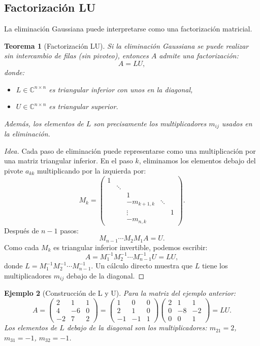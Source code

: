 \documentclass[a4paper,11pt]{report}
\newtheorem{theorem}{Teorema}[chapter]
\newtheorem{example}[theorem]{Ejemplo}
\begin{document}
\subsection{Factorización LU}

La eliminación Gaussiana puede interpretarse como una factorización matricial.

\begin{theorem}[Factorización LU]
Si la eliminación Gaussiana se puede realizar sin intercambio de filas (sin pivoteo), entonces $A$ admite una factorización:
\[
A = LU,
\]
donde:
\begin{itemize}
\item $L \in \mathbb{C}^{n \times n}$ es triangular inferior con unos en la diagonal,
\item $U \in \mathbb{C}^{n \times n}$ es triangular superior.
\end{itemize}
Además, los elementos de $L$ son precisamente los multiplicadores $m_{ij}$ usados en la eliminación.
\end{theorem}

\begin{proof}[Idea]
Cada paso de eliminación puede representarse como una multiplicación por una matriz triangular inferior. En el paso $k$, eliminamos los elementos debajo del pivote $a_{kk}$ multiplicando por la izquierda por:
\[
M_k = \begin{pmatrix}
1 & & & & \\
& \ddots & & & \\
& & 1 & & \\
& & -m_{k+1,k} & \ddots & \\
& & \vdots & & 1 \\
& & -m_{n,k} & & 
\end{pmatrix}.
\]
Después de $n-1$ pasos:
\[
M_{n-1} \cdots M_2 M_1 A = U.
\]
Como cada $M_k$ es triangular inferior invertible, podemos escribir:
\[
A = M_1^{-1} M_2^{-1} \cdots M_{n-1}^{-1} U = LU,
\]
donde $L = M_1^{-1} M_2^{-1} \cdots M_{n-1}^{-1}$. Un cálculo directo muestra que $L$ tiene los multiplicadores $m_{ij}$ debajo de la diagonal.
\end{proof}

\begin{example}[Construcción de L y U]
Para la matriz del ejemplo anterior:
\[
A = \begin{pmatrix}
2 & 1 & 1 \\
4 & -6 & 0 \\
-2 & 7 & 2
\end{pmatrix}
=
\begin{pmatrix}
1 & 0 & 0 \\
2 & 1 & 0 \\
-1 & -1 & 1
\end{pmatrix}
\begin{pmatrix}
2 & 1 & 1 \\
0 & -8 & -2 \\
0 & 0 & 1
\end{pmatrix}
= LU.
\]
Los elementos de $L$ debajo de la diagonal son los multiplicadores: $m_{21} = 2$, $m_{31} = -1$, $m_{32} = -1$.
\end{example}
\end{document}

